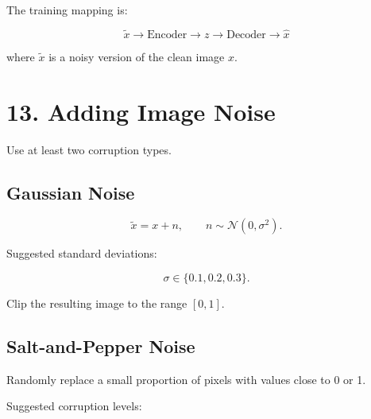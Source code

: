 \documentclass[10pt]{article}
\begin{document}
The training mapping is:

\[
\boxed{\tilde{x}\rightarrow\text{Encoder}\rightarrow z
\rightarrow\text{Decoder}\rightarrow\hat{x}}
\]

where $\tilde{x}$ is a noisy version of the clean image $x$.

\begin{center}
\end{center}

\section*{13. Adding Image Noise}

Use at least two corruption types.

\subsection*{Gaussian Noise}

\[
\tilde{x}=x+n,
\qquad
n\sim\mathcal{N}(0,\sigma^2).
\]

Suggested standard deviations:

\[
\sigma\in\{0.1,0.2,0.3\}.
\]

Clip the resulting image to the range $[0,1]$.

\subsection*{Salt-and-Pepper Noise}

Randomly replace a small proportion of pixels with values close to 0 or 1.

Suggested corruption levels:
\end{document}
